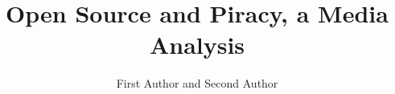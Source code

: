 \documentclass[12pt,babel,english,man]{apa6}
\title{Open Source and Piracy, a Media Analysis}
\author{First Author and Second Author}
\affiliation{Department of Both Authors\\ University}
\begin{document}
\maketitle
\nocite{*}


\end{document}
